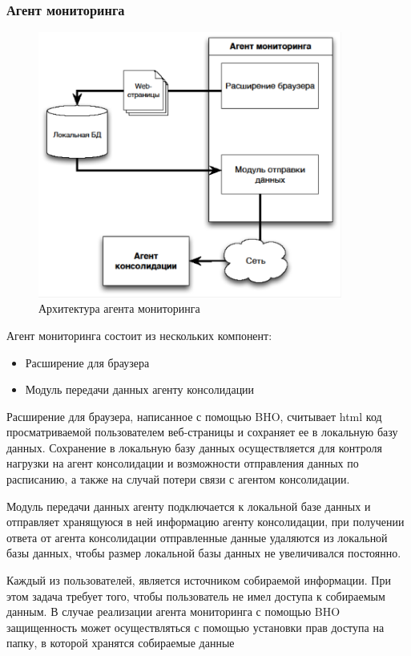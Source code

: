 \documentclass[russian, utf8, emptystyle]{eskdtext}
\begin{document}
\subsubsection{Агент мониторинга}
\begin{figure}[h]
	\begin{center}
		\includegraphics[width=10cm]{pic/agent1.png}
		\caption{Архитектура агента мониторинга}
		\label{fig:low_sigma}
	\end{center}
\end{figure}
Агент мониторинга состоит из нескольких компонент:
\begin{itemize}
	\item Расширение для браузера
	\item Модуль передачи данных агенту консолидации
\end{itemize}


Расширение для браузера, написанное с помощью BHO,  считывает html код просматриваемой пользователем веб-страницы и сохраняет ее в локальную базу данных. Сохранение в локальную базу данных осуществляется для контроля нагрузки на агент консолидации и возможности отправления данных по расписанию, а также на случай потери связи с агентом консолидации.

Модуль передачи данных агенту подключается к локальной базе данных и отправляет хранящуюся в ней информацию агенту консолидации, при получении ответа от агента консолидации отправленные данные удаляются из локальной базы данных, чтобы размер локальной базы данных не увеличивался постоянно.

Каждый из пользователей, является источником собираемой информации. При этом задача требует того, чтобы пользователь не имел доступа к собираемым данным. В случае реализации агента мониторинга с помощью BHO защищенность может осуществляться с помощью установки прав доступа на папку, в которой хранятся собираемые данные
\end{document}
